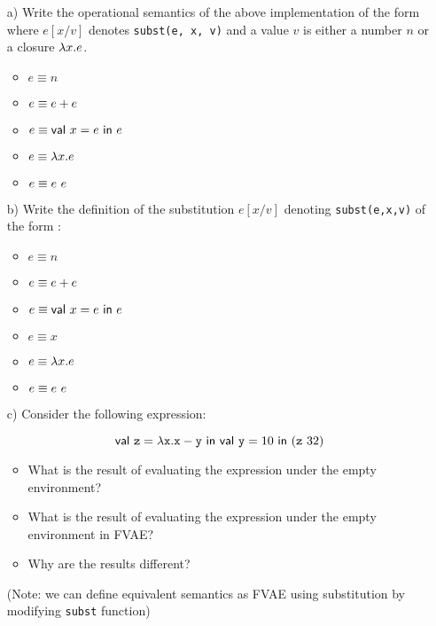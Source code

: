 \begin{enumerate}
\begin{itemize}
  \item[a)]
Write the operational semantics of the above implementation 
of the form 
where $e[x/v]$ denotes \verb!subst(e, x, v)! and a value $v$ is either a number $n$ or
a closure $\lambda x.e$.

\begin{itemize}
  \item $e \equiv n$
  \item $e \equiv e+e$
  \item $e \equiv \textsf{val}\ x=e\ \textsf{in}\ e$
  \item $e \equiv \lambda x.e$
  \item $e \equiv e\ e$
\end{itemize}

  \item[b)] Write the definition of the substitution $e[x/v]$ denoting \verb!subst(e,x,v)!
of the form :
\begin{itemize}
  \item $e \equiv n$
  \item $e \equiv e+e$
  \item $e \equiv \textsf{val}\ x=e\ \textsf{in}\ e$
  \item $e \equiv x$
  \item $e \equiv \lambda x.e$
  \item $e \equiv e\ e$
\end{itemize}

  \item[c)] Consider the following expression:

\[
\ebind{\code{z}}{\efun{\cx}{\esub{\cx}{\cy}}}{
    \ebind{\cy}{10}{
        (\eapp{\code{z}}{32})
    }
}
\]

\begin{itemize}
\item What is the result of evaluating the expression under the empty environment?
\item What is the result of evaluating the expression under the empty environment in FVAE?
\item Why are the results different?
\end{itemize}
    (Note: we can define equivalent semantics as FVAE using substitution
    by modifying \verb!subst! function)


\end{itemize}

\end{enumerate}
